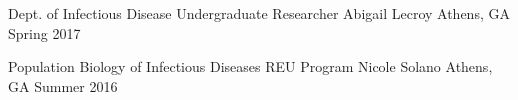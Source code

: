 
\begin{cventries}

    \cventry
    {Dept. of Infectious Disease Undergraduate Researcher} %
    {Abigail Lecroy} %
    {Athens, GA} %
    {Spring 2017} %
    {
      \begin{cvitems}
      \end{cvitems}
    }

    \cventry
    {Population Biology of Infectious Diseases REU Program} %
    {Nicole Solano} %
    {Athens, GA} %
    {Summer 2016} %
    {
      \begin{cvitems}
      \end{cvitems}
    }

\end{cventries}
